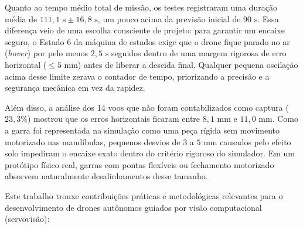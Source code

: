 Quanto ao tempo médio total de missão, os testes registraram uma duração média de $111{,}1\text{ s} \pm 16{,}8\text{ s}$, um pouco acima da previsão inicial de $90\text{ s}$. Essa diferença veio de uma escolha consciente de projeto: para garantir um encaixe seguro, o Estado 6 da máquina de estados exige que o drone fique parado no ar (\textit{hover}) por pelo menos $2{,}5\text{ s}$ seguidos dentro de uma margem rigorosa de erro horizontal ($\le 5\text{ mm}$) antes de liberar a descida final. Qualquer pequena oscilação acima desse limite zerava o contador de tempo, priorizando a precisão e a segurança mecânica em vez da rapidez.

Além disso, a análise dos 14 voos que não foram contabilizados como captura ($23{,}3\%$) mostrou que os erros horizontais ficaram entre $8{,}1\text{ mm}$ e $11{,}0\text{ mm}$. Como a garra foi representada na simulação como uma peça rígida sem movimento motorizado nas mandíbulas, pequenos desvios de $3$ a $5\text{ mm}$ causados pelo efeito solo impediram o encaixe exato dentro do critério rigoroso do simulador. Em um protótipo físico real, garras com pontas flexíveis ou fechamento motorizado absorvem naturalmente desalinhamentos desse tamanho.


Este trabalho trouxe contribuições práticas e metodológicas relevantes para o desenvolvimento de drones autônomos guiados por visão computacional (servovisão):

